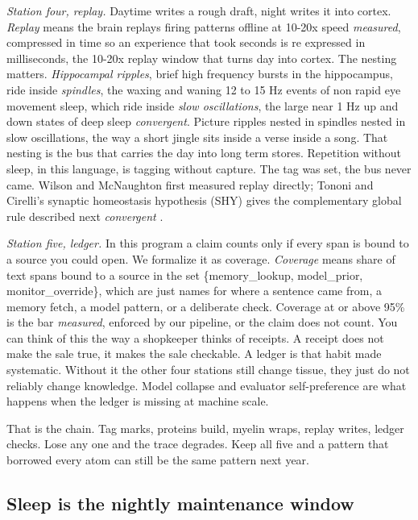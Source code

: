 \textit{Station four, replay.} Daytime writes a rough draft, night writes it into cortex. \textit{Replay} means the brain replays firing patterns offline at 10-20x speed \textit{measured}, compressed in time so an experience that took seconds is re expressed in milliseconds, the 10-20x replay window that turns day into cortex. The nesting matters. \textit{Hippocampal ripples}, brief high frequency bursts in the hippocampus, ride inside \textit{spindles}, the waxing and waning 12 to 15 Hz events of non rapid eye movement sleep, which ride inside \textit{slow oscillations}, the large near 1 Hz up and down states of deep sleep \textit{convergent}. Picture ripples nested in spindles nested in slow oscillations, the way a short jingle sits inside a verse inside a song. That nesting is the bus that carries the day into long term stores. Repetition without sleep, in this language, is tagging without capture. The tag was set, the bus never came. Wilson and McNaughton first measured replay directly; Tononi and Cirelli's synaptic homeostasis hypothesis (SHY) gives the complementary global rule described next \textit{convergent} \citep{baars1988,clark2016}.

\textit{Station five, ledger.} In this program a claim counts only if every span is bound to a source you could open. We formalize it as coverage. \textit{Coverage} means share of text spans bound to a source in the set \{memory\_lookup, model\_prior, monitor\_override\}, which are just names for where a sentence came from, a memory fetch, a model pattern, or a deliberate check. Coverage at or above 95\% is the bar \textit{measured}, enforced by our pipeline, or the claim does not count. You can think of this the way a shopkeeper thinks of receipts. A receipt does not make the sale true, it makes the sale checkable. A ledger is that habit made systematic. Without it the other four stations still change tissue, they just do not reliably change knowledge. Model collapse \citep{shumailov2024} and evaluator self-preference \citep{panickssery2024} are what happens when the ledger is missing at machine scale.

That is the chain. Tag marks, proteins build, myelin wraps, replay writes, ledger checks. Lose any one and the trace degrades. Keep all five and a pattern that borrowed every atom can still be the same pattern next year.

\subsection*{Sleep is the nightly maintenance window}

